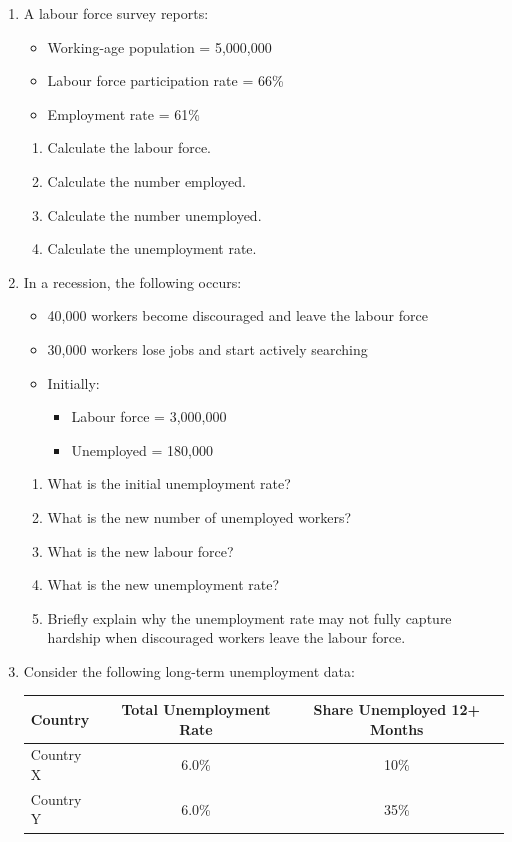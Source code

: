 \documentclass[12pt]{article}
\begin{document}
\begin{enumerate}[label=\textbf{Question \arabic*.}]
\item A labour force survey reports:
\begin{itemize}
    \item Working-age population = 5{,}000{,}000
    \item Labour force participation rate = 66\%
    \item Employment rate = 61\%
\end{itemize}

\begin{enumerate}[label=(\alph*)]
    \item Calculate the labour force.
    \item Calculate the number employed.
    \item Calculate the number unemployed.
    \item Calculate the unemployment rate.
\end{enumerate}
\newpage
\item In a recession, the following occurs:
\begin{itemize}
    \item 40{,}000 workers become discouraged and leave the labour force
    \item 30{,}000 workers lose jobs and start actively searching
    \item Initially:
    \begin{itemize}
        \item Labour force = 3{,}000{,}000
        \item Unemployed = 180{,}000
    \end{itemize}
\end{itemize}

\begin{enumerate}[label=(\alph*)]
    \item What is the initial unemployment rate?
    \item What is the new number of unemployed workers?
    \item What is the new labour force?
    \item What is the new unemployment rate?
    \item Briefly explain why the unemployment rate may not fully capture hardship when discouraged workers leave the labour force.
\end{enumerate}

\item Consider the following long-term unemployment data:

\begin{center}
\begin{tabular}{lcc}
\toprule
Country & Total Unemployment Rate & Share Unemployed 12+ Months \\
\midrule
Country X & 6.0\% & 10\% \\
Country Y & 6.0\% & 35\% \\
\bottomrule
\end{tabular}
\end{center}


\end{enumerate}
\end{document}
